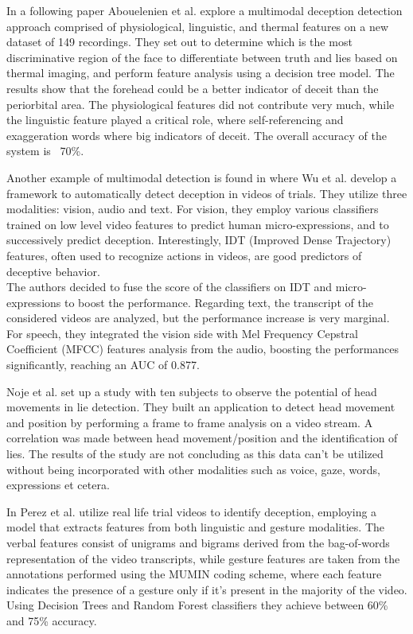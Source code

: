 In a following paper \cite{7782429} Abouelenien et al. explore a multimodal deception detection approach comprised of physiological, linguistic, and thermal features on a new dataset of 149 recordings. They set out to determine which is the most discriminative region of the face to differentiate between truth and lies based on thermal imaging, and perform feature analysis using a decision tree model. The results show that the forehead could be a better indicator of deceit than the periorbital area. The physiological features did not contribute very much, while the linguistic feature played a critical role, where self-referencing and exaggeration words where big indicators of deceit. The overall accuracy of the system is ~70\%.

Another example of multimodal detection is found in \cite{DBLP:journals/corr/abs-1712-04415} where Wu et al. develop a framework to automatically detect deception in videos of trials. They utilize three modalities: vision, audio and text. For vision, they employ various classifiers trained on low level video features to predict human micro-expressions, and to successively predict deception. Interestingly, IDT (Improved Dense Trajectory) features, often used to recognize actions in videos, are good predictors of deceptive behavior. \\
The authors decided to fuse the score of the classifiers on IDT and micro-expressions to boost the performance. Regarding text, the transcript of the considered videos are analyzed, but the performance increase is very marginal. \\
For speech, they integrated the vision side with Mel Frequency Cepstral Coefficient (MFCC) features analysis from the audio, boosting the performances significantly, reaching an AUC of 0.877. 

Noje et al. \cite{7367432} set up a study with ten subjects to observe the potential of head movements in lie detection. They built an application to detect head movement and position by performing a frame to frame analysis on a video stream. A correlation was made between head movement/position and the identification of lies. The results of the study are not concluding as this data can't be utilized without being incorporated with other modalities such as voice, gaze, words, expressions et cetera.

In \cite{Perez-Rosas:2015:DDU:2818346.2820758} Perez et al. utilize real life trial videos to identify deception, employing a model that extracts features from both linguistic and gesture modalities. The verbal features consist of unigrams and bigrams derived from the bag-of-words representation of the video transcripts, while gesture features are taken from the annotations performed using the MUMIN coding scheme, where each feature indicates the presence of a gesture only if it's present in the majority of the video. Using Decision Trees and Random Forest classifiers they achieve between 60\% and 75\% accuracy.


